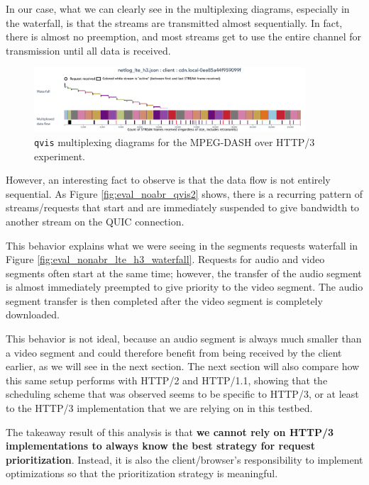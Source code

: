 In our case, what we can clearly see in the multiplexing diagrams, especially in the waterfall, is that the streams are transmitted almost sequentially. In fact, there is almost no preemption, and most streams get to use the entire channel for transmission until all data is received.

\begin{figure}[h]
    \centering
    \includegraphics[width=0.9\textwidth]{res/eval_nonabr_qvis1.png}
    \caption{\texttt{qvis} multiplexing diagrams for the MPEG-DASH over HTTP/3 experiment.}
    \label{fig:eval_noabr_qvis1}
\end{figure}

However, an interesting fact to observe is that the data flow is not entirely sequential. As Figure \ref{fig:eval_noabr_qvis2} shows, there is a recurring pattern of streams/requests that start and are immediately suspended to give bandwidth to another stream on the QUIC connection.

This behavior explains what we were seeing in the segments requests waterfall in Figure \ref{fig:eval_nonabr_lte_h3_waterfall}. Requests for audio and video segments often start at the same time; however, the transfer of the audio segment is almost immediately preempted to give priority to the video segment. The audio segment transfer is then completed after the video segment is completely downloaded.

This behavior is not ideal, because an audio segment is always much smaller than a video segment and could therefore benefit from being received by the client earlier, as we will see in the next section. The next section will also compare how this same setup performs with HTTP/2 and HTTP/1.1, showing that the scheduling scheme that was observed seems to be specific to HTTP/3, or at least to the HTTP/3 implementation that we are relying on in this testbed.

The takeaway result of this analysis is that \textbf{we cannot rely on HTTP/3 implementations to always know the best strategy for request prioritization}. Instead, it is also the client/browser's responsibility to implement optimizations so that the prioritization strategy is meaningful.

